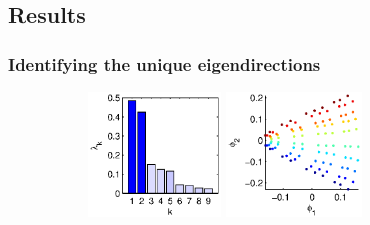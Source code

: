 \subsection{Results}

\subsubsection{Identifying the unique eigendirections}

\begin{figure}[t]
\centering
\def\figheight{1.3in}
%
\begin{subfigure}[t]{1.5in}
\centering
\includegraphics[height=\figheight]{chemotaxis1_evals}
\includegraphics[height=\figheight]{chemotaxis1_embed_good}

\end{subfigure}
\end{figure}
